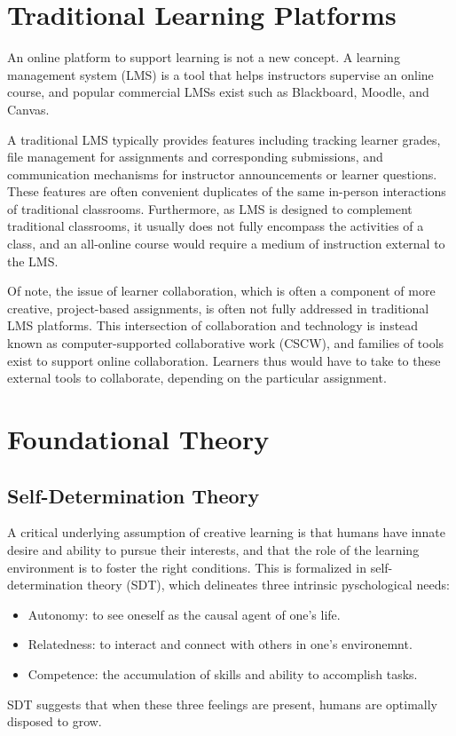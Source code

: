 \documentclass[12pt,twoside]{mitthesis}
\begin{document}
\section{Traditional Learning Platforms}

An online platform to support learning is not a new concept. A learning management system (LMS) is a tool that helps instructors supervise an online course, and popular commercial LMSs exist such as Blackboard, Moodle, and Canvas. 

A traditional LMS typically provides features including tracking learner grades, file management for assignments and corresponding submissions, and communication mechanisms for instructor announcements or learner questions. These features are often convenient duplicates of the same in-person interactions of traditional classrooms. Furthermore, as LMS is designed to complement traditional classrooms, it usually does not fully encompass the activities of a class, and an all-online course would require a medium of instruction external to the LMS.~\cite{zagalsky2015emergence}

Of note, the issue of learner collaboration, which is often a component of more creative, project-based assignments, is often not fully addressed in traditional LMS platforms. This intersection of collaboration and technology is instead known as computer-supported collaborative work (CSCW), and families of tools exist to support online collaboration. Learners thus would have to take to these external tools to collaborate, depending on the particular assignment.

\section{Foundational Theory}

\subsection{Self-Determination Theory}

A critical underlying assumption of creative learning is that humans have innate desire and ability to pursue their interests, and that the role of the learning environment is to foster the right conditions. This is formalized in self-determination theory (SDT), which delineates three intrinsic pyschological needs:
\begin{itemize}
\item Autonomy: to see oneself as the causal agent of one's life.
\item Relatedness: to interact and connect with others in one's environemnt.
\item Competence: the accumulation of skills and ability to accomplish tasks.
\end{itemize}
SDT suggests that when these three feelings are present, humans are optimally disposed to grow.~\cite{ryan2000self}\cite{selfdetermination2}
\end{document}
